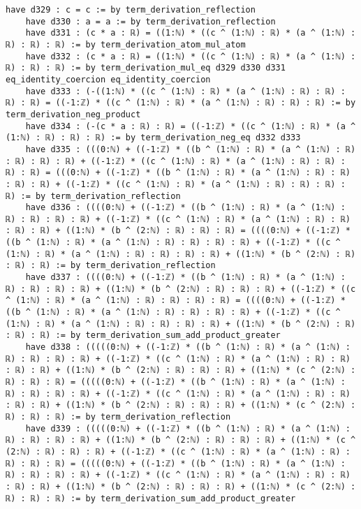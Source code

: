 \documentclass{article}
\begin{document}
\begin{tcolorbox}[colback=white!10, width=\linewidth]
\begin{lstlisting}[language=Lean4]
    have d329 : c = c := by term_derivation_reflection
    have d330 : a = a := by term_derivation_reflection
    have d331 : (c * a : ℝ) = ((1:ℕ) * ((c ^ (1:ℕ) : ℝ) * (a ^ (1:ℕ) : ℝ) : ℝ) : ℝ) := by term_derivation_atom_mul_atom
    have d332 : (c * a : ℝ) = ((1:ℕ) * ((c ^ (1:ℕ) : ℝ) * (a ^ (1:ℕ) : ℝ) : ℝ) : ℝ) := by term_derivation_mul_eq d329 d330 d331 eq_identity_coercion eq_identity_coercion
    have d333 : (-((1:ℕ) * ((c ^ (1:ℕ) : ℝ) * (a ^ (1:ℕ) : ℝ) : ℝ) : ℝ) : ℝ) = ((-1:ℤ) * ((c ^ (1:ℕ) : ℝ) * (a ^ (1:ℕ) : ℝ) : ℝ) : ℝ) := by term_derivation_neg_product
    have d334 : (-(c * a : ℝ) : ℝ) = ((-1:ℤ) * ((c ^ (1:ℕ) : ℝ) * (a ^ (1:ℕ) : ℝ) : ℝ) : ℝ) := by term_derivation_neg_eq d332 d333
    have d335 : (((0:ℕ) + ((-1:ℤ) * ((b ^ (1:ℕ) : ℝ) * (a ^ (1:ℕ) : ℝ) : ℝ) : ℝ) : ℝ) + ((-1:ℤ) * ((c ^ (1:ℕ) : ℝ) * (a ^ (1:ℕ) : ℝ) : ℝ) : ℝ) : ℝ) = (((0:ℕ) + ((-1:ℤ) * ((b ^ (1:ℕ) : ℝ) * (a ^ (1:ℕ) : ℝ) : ℝ) : ℝ) : ℝ) + ((-1:ℤ) * ((c ^ (1:ℕ) : ℝ) * (a ^ (1:ℕ) : ℝ) : ℝ) : ℝ) : ℝ) := by term_derivation_reflection
    have d336 : ((((0:ℕ) + ((-1:ℤ) * ((b ^ (1:ℕ) : ℝ) * (a ^ (1:ℕ) : ℝ) : ℝ) : ℝ) : ℝ) + ((-1:ℤ) * ((c ^ (1:ℕ) : ℝ) * (a ^ (1:ℕ) : ℝ) : ℝ) : ℝ) : ℝ) + ((1:ℕ) * (b ^ (2:ℕ) : ℝ) : ℝ) : ℝ) = ((((0:ℕ) + ((-1:ℤ) * ((b ^ (1:ℕ) : ℝ) * (a ^ (1:ℕ) : ℝ) : ℝ) : ℝ) : ℝ) + ((-1:ℤ) * ((c ^ (1:ℕ) : ℝ) * (a ^ (1:ℕ) : ℝ) : ℝ) : ℝ) : ℝ) + ((1:ℕ) * (b ^ (2:ℕ) : ℝ) : ℝ) : ℝ) := by term_derivation_reflection
    have d337 : ((((0:ℕ) + ((-1:ℤ) * ((b ^ (1:ℕ) : ℝ) * (a ^ (1:ℕ) : ℝ) : ℝ) : ℝ) : ℝ) + ((1:ℕ) * (b ^ (2:ℕ) : ℝ) : ℝ) : ℝ) + ((-1:ℤ) * ((c ^ (1:ℕ) : ℝ) * (a ^ (1:ℕ) : ℝ) : ℝ) : ℝ) : ℝ) = ((((0:ℕ) + ((-1:ℤ) * ((b ^ (1:ℕ) : ℝ) * (a ^ (1:ℕ) : ℝ) : ℝ) : ℝ) : ℝ) + ((-1:ℤ) * ((c ^ (1:ℕ) : ℝ) * (a ^ (1:ℕ) : ℝ) : ℝ) : ℝ) : ℝ) + ((1:ℕ) * (b ^ (2:ℕ) : ℝ) : ℝ) : ℝ) := by term_derivation_sum_add_product_greater
    have d338 : (((((0:ℕ) + ((-1:ℤ) * ((b ^ (1:ℕ) : ℝ) * (a ^ (1:ℕ) : ℝ) : ℝ) : ℝ) : ℝ) + ((-1:ℤ) * ((c ^ (1:ℕ) : ℝ) * (a ^ (1:ℕ) : ℝ) : ℝ) : ℝ) : ℝ) + ((1:ℕ) * (b ^ (2:ℕ) : ℝ) : ℝ) : ℝ) + ((1:ℕ) * (c ^ (2:ℕ) : ℝ) : ℝ) : ℝ) = (((((0:ℕ) + ((-1:ℤ) * ((b ^ (1:ℕ) : ℝ) * (a ^ (1:ℕ) : ℝ) : ℝ) : ℝ) : ℝ) + ((-1:ℤ) * ((c ^ (1:ℕ) : ℝ) * (a ^ (1:ℕ) : ℝ) : ℝ) : ℝ) : ℝ) + ((1:ℕ) * (b ^ (2:ℕ) : ℝ) : ℝ) : ℝ) + ((1:ℕ) * (c ^ (2:ℕ) : ℝ) : ℝ) : ℝ) := by term_derivation_reflection
    have d339 : (((((0:ℕ) + ((-1:ℤ) * ((b ^ (1:ℕ) : ℝ) * (a ^ (1:ℕ) : ℝ) : ℝ) : ℝ) : ℝ) + ((1:ℕ) * (b ^ (2:ℕ) : ℝ) : ℝ) : ℝ) + ((1:ℕ) * (c ^ (2:ℕ) : ℝ) : ℝ) : ℝ) + ((-1:ℤ) * ((c ^ (1:ℕ) : ℝ) * (a ^ (1:ℕ) : ℝ) : ℝ) : ℝ) : ℝ) = (((((0:ℕ) + ((-1:ℤ) * ((b ^ (1:ℕ) : ℝ) * (a ^ (1:ℕ) : ℝ) : ℝ) : ℝ) : ℝ) + ((-1:ℤ) * ((c ^ (1:ℕ) : ℝ) * (a ^ (1:ℕ) : ℝ) : ℝ) : ℝ) : ℝ) + ((1:ℕ) * (b ^ (2:ℕ) : ℝ) : ℝ) : ℝ) + ((1:ℕ) * (c ^ (2:ℕ) : ℝ) : ℝ) : ℝ) := by term_derivation_sum_add_product_greater

\end{lstlisting}
\end{tcolorbox}
\end{document}

